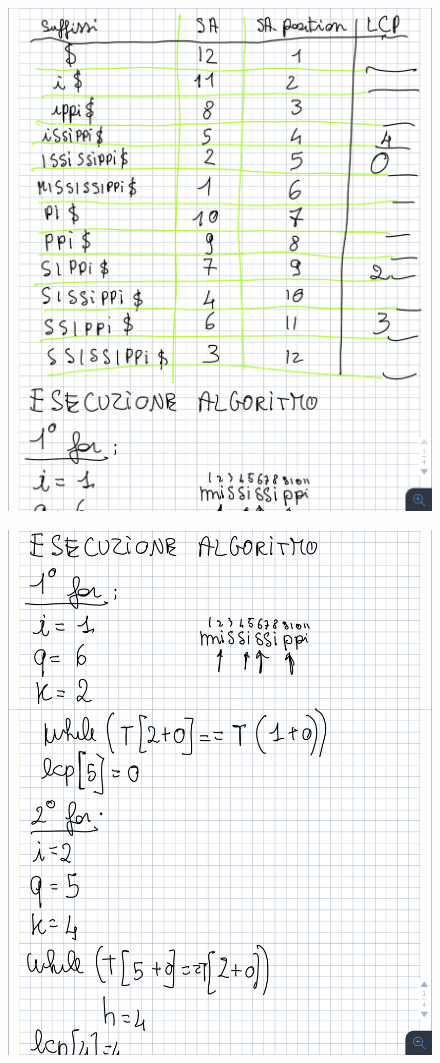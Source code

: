 \documentclass[14pt]{extreport}
\begin{document}
\begin{figure}[H]
\centering
  \includegraphics[width=\linewidth]{IMG_0155.jpg}
\end{figure}
\begin{figure}[H]
\centering
  \includegraphics[width=0.6\linewidth]{IMG_0156.jpg}
\end{figure}
\end{document}

